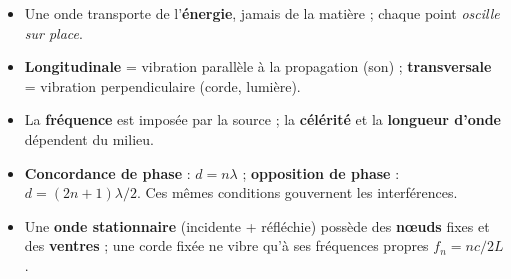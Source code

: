 \documentclass[11pt,a4paper]{article}
\begin{document}
\vspace{0.3cm}
\begin{tcolorbox}[boxbase,colback=primarydark!6,colframe=primarydark,
   title={\textsc{À retenir absolument}}]
\begin{itemize}[leftmargin=1.5em,topsep=2pt,itemsep=2pt]
  \item Une onde transporte de l'\textbf{énergie}, jamais de la matière ; chaque point
        \emph{oscille sur place}.
  \item \textbf{Longitudinale} = vibration parallèle à la propagation (son) ;
        \textbf{transversale} = vibration perpendiculaire (corde, lumière).
  \item La \textbf{fréquence} est imposée par la source ; la \textbf{célérité} et la
        \textbf{longueur d'onde} dépendent du milieu.
  \item \textbf{Concordance de phase} : $d=n\lambda$ ; \textbf{opposition de phase} :
        $d=(2n+1)\lambda/2$. Ces mêmes conditions gouvernent les interférences.
  \item Une \textbf{onde stationnaire} (incidente + réfléchie) possède des \textbf{nœuds}
        fixes et des \textbf{ventres} ; une corde fixée ne vibre qu'à ses fréquences propres
        $f_n = nc/2L$.
\end{itemize}
\end{tcolorbox}
\end{document}
